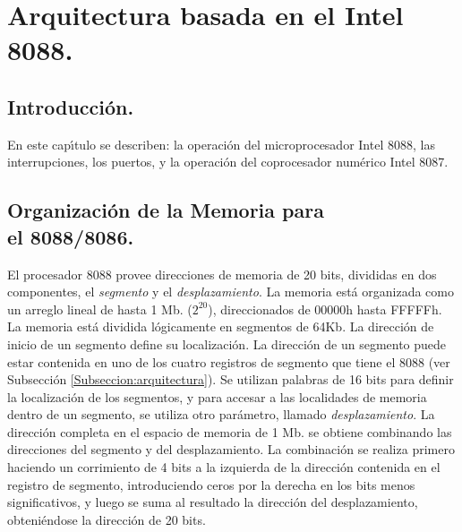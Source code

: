 \chapter[Arquitectura basada en 8088.]{Arquitectura basada en el Intel 8088.}
\label{Capitulo:descripcionfuncional}


\fancyhead[LE,RO]{\thepage}


\section{Introducci\'on.}
\label{Seccion:IntroCap2}

En este cap\'{\i}tulo se describen: la operaci\'on del microprocesador Intel 8088, las %
interrupciones, los puertos, y la operaci\'on del coprocesador num\'erico Intel 8087.


\section{Or\-ga\-ni\-za\-ci\'on de la Me\-mo\-ria pa\-ra\\el 8088/8086.}
\label{Seccion:orgamem}

El procesador 8088 provee direcciones de memoria de 20 bits, divididas en dos componentes, el %
{\em segmento} y el {\em desplazamiento}. La memoria est\'a organizada como un arreglo lineal %
de hasta 1 Mb. ($2^{20}$), direccionados de 00000h hasta FFFFFh. La memoria est\'a dividida %
l\'ogicamente en segmentos de 64Kb. La direcci\'on de inicio de un segmento define su %
localizaci\'on. La direcci\'on de un segmento puede estar contenida en uno de los cuatro %
registros de segmento que tiene el 8088 (ver Subsecci\'on \ref{Subseccion:arquitectura}). Se %
utilizan palabras de 16 bits para definir la localizaci\'on de los segmentos, y para accesar a %
las localidades de memoria dentro de un segmento, se utiliza otro par\'ametro, llamado {\em %
desplazamiento}. La direcci\'on completa en el espacio de memoria de 1 Mb. se obtiene combinando %
las direcciones del segmento y del desplazamiento. La combinaci\'on se realiza primero haciendo %
un corrimiento de 4 bits a la izquierda de la direcci\'on contenida en el registro de segmento, %
introduciendo ceros por la derecha en los bits menos significativos, y luego se suma al %
resultado la direcci\'on del desplazamiento, obteni\'endose la direcci\'on de 20 bits.

